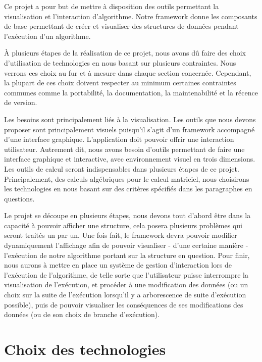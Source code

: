 \documentclass[a4paper, 11pt]{article}
\begin{document}
Ce projet a pour but de mettre à disposition des outils permettant la visualisation et l'interaction d'algorithme. Notre framework donne les composants de base permettant de créer et visualiser  des structures de données pendant l'exécution d'un algorithme.

À plusieurs étapes de la réalisation de ce projet, nous avons dû faire des choix d'utilisation de technologies en nous basant sur plusieurs contraintes. Nous verrons ces choix au fur et à mesure dans chaque section concernée. Cependant, la plupart de ces choix doivent respecter au minimum certaines contraintes communes comme la portabilité, la documentation, la maintenabilité et la récence de version.

Les besoins sont principalement liés à la visualisation. Les outils que nous devons proposer sont principalement visuels puisqu'il s'agit d'un framework accompagné d'une interface graphique.
L'application doit pouvoir offrir une interaction utilisateur. Autrement dit, nous avons besoin d'outils permettant de faire une interface graphique et interactive, avec environnement visuel en trois dimensions.
Les outils de calcul seront indispensables dans plusieurs étapes de ce projet. Principalement, des calculs algébriques pour le calcul matriciel, nous choisirons les technologies en nous basant sur des critères spécifiés dans les paragraphes en questions.

Le projet se découpe en plusieurs étapes, nous devons tout d'abord être dans la capacité à pouvoir afficher une structure, cela posera plusieurs problèmes qui seront traités un par un.
Une fois fait, le framework devra pouvoir modifier dynamiquement l'affichage afin de pouvoir visualiser - d'une certaine manière - l'exécution de notre algorithme portant sur la structure en question.
Pour finir, nous aurons à mettre en place un système de gestion d'interaction lors de l'exécution de l'algorithme, de telle sorte que l'utilisateur puisse interrompre la visualisation de l'exécution, et procéder à une modification des données (ou un choix sur la suite de l'exécution lorsqu'il y a arborescence de suite d'exécution possible), puis de pouvoir visualiser les conséquences de ses modifications des données (ou de son choix de branche d'exécution).

\newpage
\section{Choix des technologies}
\end{document}
